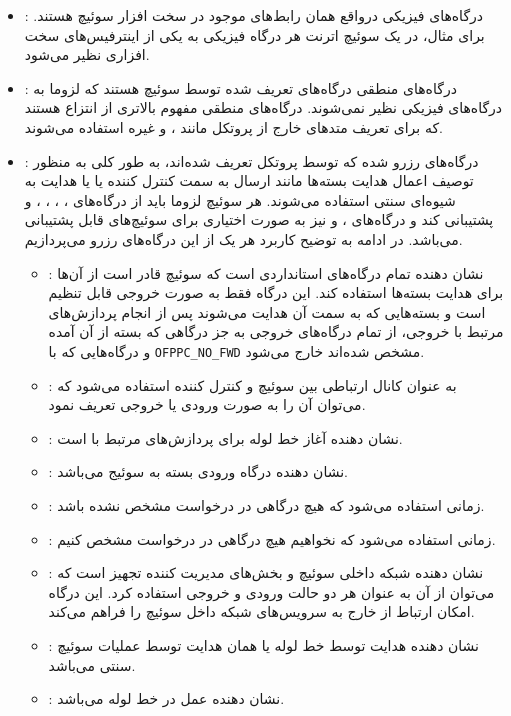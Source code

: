 \begin{itemize}
	\item
{}:
درگاه‌های فیزیکی درواقع همان رابط‌های موجود در سخت افزار سوئیچ هستند. برای مثال، در یک سوئیچ اترنت هر درگاه فیزیکی به یکی از اینترفیس‌های سخت افزاری نظیر می‌شود.
	\item
{}:
درگاه‌های منطقی درگاه‌های تعریف شده توسط سوئیچ هستند که لزوما به درگاه‌های فیزیکی نظیر نمی‌شوند. درگاه‌های منطقی مفهوم بالاتری از انتزاع هستند که برای تعریف متد‌های خارج از پروتکل  مانند ،  و غیره استفاده می‌شوند.
	\item
{}:
درگاه‌های رزرو شده که توسط پروتکل تعریف شده‌اند، به طور کلی به منظور توصیف اعمال هدایت بسته‌ها مانند ارسال به سمت کنترل کننده یا  یا هدایت به شیوه‌ای سنتی  استفاده می‌شوند. هر سوئیچ  لزوما باید از درگاه‌های ، ، ، ،  و  پشتیبانی کند و درگاه‌های ،  و  نیز به صورت اختیاری برای سوئیچ‌های  قابل پشتیبانی می‌باشد. در ادامه به توضیح کاربرد هر یک از این درگاه‌های رزرو می‌پردازیم.
\begin{itemize}
	\item {}:
نشان دهنده تمام درگاه‌های استانداردی است که سوئیچ قادر است از آن‌ها برای هدایت بسته‌ها استفاده کند. این درگاه فقط به صورت خروجی قابل تنظیم است و بسته‌هایی که به سمت آن هدایت می‌شوند پس از انجام پردازش‌های مرتبط با خروجی، از تمام درگاه‌های خروجی به جز درگاهی که بسته از آن آمده و درگاه‌هایی که با \texttt{OFPPC\_NO\_FWD} مشخص شده‌اند خارج می‌شود.
	\item {}:
به عنوان کانال ارتباطی بین سوئیچ و کنترل کننده استفاده می‌شود که می‌توان آن را به صورت ورودی یا خروجی تعریف نمود.
	\item {}:
نشان دهنده آغاز خط لوله برای پردازش‌های مرتبط با  است.
	\item {}:
نشان دهنده درگاه ورودی بسته به سوئیج می‌باشد.
	\item {}:
زمانی استفاده می‌شود که هیچ درگاهی در درخواست  مشخص نشده باشد.
	\item {}:
زمانی استفاده می‌شود که نخواهیم هیچ درگاهی در درخواست  مشخص کنیم.
	\item {}:
نشان دهنده شبکه داخلی سوئیچ و بخش‌های مدیریت کننده تجهیز است که می‌توان از آن به عنوان هر دو حالت ورودی و خروجی استفاده کرد. این درگاه امکان ارتباط از خارج به سرویس‌های شبکه داخل سوئیچ  را فراهم می‌کند.
	\item {}:
نشان دهنده هدایت توسط خط لوله  یا همان هدایت توسط عملیات سوئیچ سنتی می‌باشد.
	\item {}:
نشان دهنده عمل  در خط لوله  می‌باشد.
\end{itemize}
\end{itemize}

